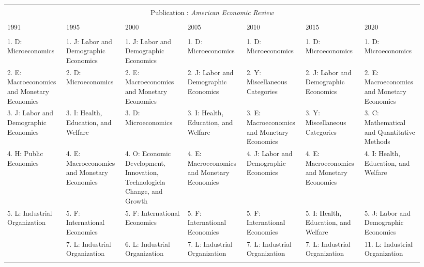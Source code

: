 
\begin{table}[h] \centering 
  \caption{} 
  \label{} 
\begin{tabular}{@{\extracolsep{5pt}} lllllll} 
\\[-1.8ex]\hline 
\hline \\[-1.8ex] \multicolumn{7}{c}{Publication : \textit{American Economic Review}} \\
 \cline{1-7} \\
1991 & 1995 & 2000 & 2005 & 2010 & 2015 & 2020 \\ 
\hline \\[-1.8ex] 
1. D: Microeconomics & 1. J: Labor and Demographic Economics & 1. J: Labor and Demographic Economics & 1. D: Microeconomics & 1. D: Microeconomics & 1. D: Microeconomics & 1. D: Microeconomics \\ 
2. E: Macroeconomics and Monetary Economics & 2. D: Microeconomics & 2. E: Macroeconomics and Monetary Economics & 2. J: Labor and Demographic Economics & 2. Y: Miscellaneous Categories & 2. J: Labor and Demographic Economics & 2. E: Macroeconomics and Monetary Economics \\ 
3. J: Labor and Demographic Economics & 3. I: Health, Education, and Welfare & 3. D: Microeconomics & 3. I: Health, Education, and Welfare & 3. E: Macroeconomics and Monetary Economics & 3. Y: Miscellaneous Categories & 3. C: Mathematical and Quantitative Methods \\ 
4. H: Public Economics & 4. E: Macroeconomics and Monetary Economics & 4. O: Economic Development, Innovation, Technologicla Change, and Growth & 4. E: Macroeconomics and Monetary Economics & 4. J: Labor and Demographic Economics & 4. E: Macroeconomics and Monetary Economics & 4. I: Health, Education, and Welfare \\ 
5. L: Industrial Organization & 5. F: International Economics & 5. F: International Economics & 5. F: International Economics & 5. F: International Economics & 5. I: Health, Education, and Welfare & 5. J: Labor and Demographic Economics \\ 
 & 7. L: Industrial Organization & 6. L: Industrial Organization & 7. L: Industrial Organization & 7. L: Industrial Organization & 7. L: Industrial Organization & 11. L: Industrial Organization \\ 
\hline \\[-1.8ex] 
\end{tabular} 
\end{table} 
